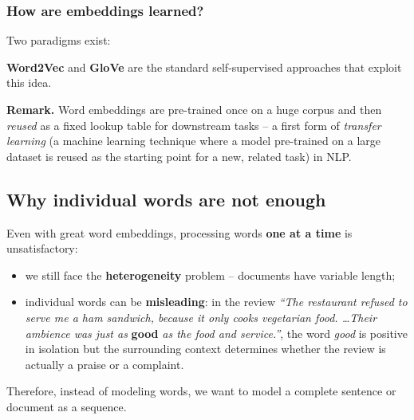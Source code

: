 \subsubsection{How are embeddings learned?}
Two paradigms exist:
\textbf{Word2Vec} and \textbf{GloVe} are the standard self-supervised approaches that exploit
this idea.

\textbf{Remark.} Word embeddings are pre-trained once on a huge corpus and then \emph{reused}
as a fixed lookup table for downstream tasks -- a first form of \emph{transfer learning} 
(a machine learning technique where a model pre-trained on a large dataset is reused as the starting point for a new, related task) in NLP.

\subsection{Why individual words are not enough}
Even with great word embeddings, processing words \textbf{one at a time} is unsatisfactory:
\begin{itemize}
  \item we still face the \textbf{heterogeneity} problem -- documents have variable length;
  \item individual words can be \textbf{misleading}: in the review
        \emph{``The restaurant refused to serve me a ham sandwich, because it only cooks
        vegetarian food. \dots Their ambience was just as} \textbf{good} \emph{as the food
        and service.''}, the word \emph{good} is positive in isolation but the surrounding
        context determines whether the review is actually a praise or a complaint.
\end{itemize}
Therefore, instead of modeling words, we want to model a complete sentence or document as a sequence.

